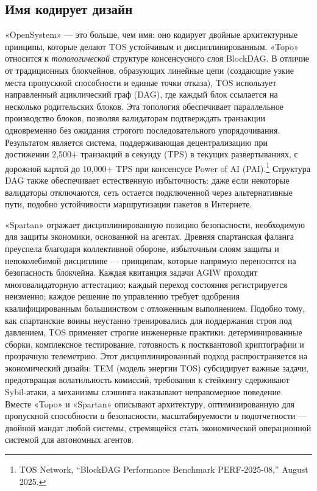 \documentclass[11pt]{article}
\begin{document}
\subsection{Имя кодирует дизайн}
«OpenSystem» — это больше, чем имя: оно кодирует двойные архитектурные принципы, которые делают TOS устойчивым и дисциплинированным. «Topo» относится к \emph{топологической} структуре консенсусного слоя BlockDAG. В отличие от традиционных блокчейнов, образующих линейные цепи (создающие узкие места пропускной способности и единые точки отказа), TOS использует направленный ациклический граф (DAG), где каждый блок ссылается на несколько родительских блоков. Эта топология обеспечивает параллельное производство блоков, позволяя валидаторам подтверждать транзакции одновременно без ожидания строгого последовательного упорядочивания. Результатом является система, поддерживающая децентрализацию при достижении 2,500+ транзакций в секунду (TPS) в текущих развертываниях, с дорожной картой до 10,000+ TPS при консенсусе Power of AI (PAI).\footnote{TOS Network, ``BlockDAG Performance Benchmark PERF-2025-08,'' August 2025.} Структура DAG также обеспечивает естественную избыточность: даже если некоторые валидаторы отключаются, сеть остается подключенной через альтернативные пути, подобно устойчивости маршрутизации пакетов в Интернете.

«Spartan» отражает дисциплинированную позицию безопасности, необходимую для защиты экономики, основанной на агентах. Древняя спартанская фаланга преуспела благодаря коллективной обороне, избыточным слоям защиты и непоколебимой дисциплине — принципам, которые напрямую переносятся на безопасность блокчейна. Каждая квитанция задачи AGIW проходит многовалидаторную аттестацию; каждый переход состояния регистрируется неизменно; каждое решение по управлению требует одобрения квалифицированным большинством с отложенным выполнением. Подобно тому, как спартанские воины неустанно тренировались для поддержания строя под давлением, TOS применяет строгие инженерные практики: детерминированные сборки, комплексное тестирование, готовность к постквантовой криптографии и прозрачную телеметрию. Этот дисциплинированный подход распространяется на экономический дизайн: TEM (модель энергии TOS) субсидирует важные задачи, предотвращая волатильность комиссий, требования к стейкингу сдерживают Sybil-атаки, а механизмы слэшинга наказывают неправомерное поведение. Вместе «Topo» и «Spartan» описывают архитектуру, оптимизированную для пропускной способности \emph{и} безопасности, масштабируемости \emph{и} подотчетности — двойной мандат любой системы, стремящейся стать экономической операционной системой для автономных агентов.
\end{document}
